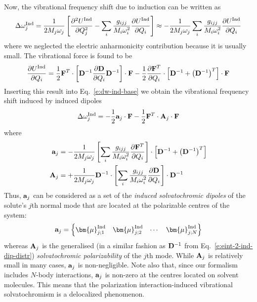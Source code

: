 \documentclass[b5paper,oneside,fleqn,11pt]{book}
\newcommand{\BM}[1]{\bm{#1}}
\newcommand{\fderiv}[2]{\ensuremath{
    \frac{\partial #1}{\partial #2}}}
\newcommand{\sderiv}[2]{\ensuremath{
    \frac{\partial^2 #1}{\partial #2^2}
    }}
\begin{document}
\begin{refsection}
Now, the vibrational frequency shift due to induction can be written
as
%
\begin{equation}\label{e:dw-ind-base}
\Delta \omega_j^{\rm Ind} =
\frac{1}{2M_j\omega_j} \left[ 
\sderiv{U^{\rm Ind}}{Q_j} -
\sum_i \frac{g_{ijj}}{M_i\omega_i^2}\fderiv{U^{\rm Ind}}{Q_i}
\right]
\approx 
-\frac{1}{2M_j\omega_j}\sum_i \frac{g_{ijj}}{M_i\omega_i^2}\fderiv{U^{\rm Ind}}{Q_i}
\end{equation}
%
where we neglected the electric anharmonicity contribution because it is usually small.
The vibrational force is found to be
%
\begin{equation} \label{e:vibr-force-ind}
\fderiv{U^{\rm Ind}}{Q_i} = \frac{1}{2} {\bf F}^{T} \cdot
     \left[ 
           {\bf D}^{-1} \fderiv{{\bf D}}{Q_i} {\bf D}^{-1}
     \right] \cdot {\bf F}
     - \frac{1}{2} \fderiv{{\bf F}^{T}}{Q_i} \cdot
     \left[
            {\bf D}^{-1} + \left({\bf D}^{-1} \right)^T
     \right] \cdot {\bf F}
\end{equation}
%
Inserting this result into Eq.~\eqref{e:dw-ind-base}
we obtain the vibrational frequency shift induced by induced dipoles
%
\begin{equation}\label{e:dw-ind-avec}
\Delta\omega_j^{\rm Ind} = - \frac{1}{2}                 {\bf a}_j \cdot {\bf F} 
                           - \frac{1}{2} {\bf F}^T \cdot {\bf A}_j \cdot {\bf F}
\end{equation}
%
where
%
\begin{subequations} \label{e:a-A}
 \begin{align}
 {\bf a}_j &= -\frac{1}{2M_j\omega_j} \left[ \sum_i \frac{g_{ijj}}{M_i\omega_i^2} 
               \fderiv{{\bf F}^T}{Q_i} \right] \cdot \left[ {\bf D}^{-1} + \left({\bf D}^{-1}\right)^T\right]\\
%
 {\bf A}_j &= +\frac{1}{2M_j\omega_j} {\bf D}^{-1} \cdot 
               \left[ \sum_i \frac{g_{ijj}}{M_i\omega_i^2} \fderiv{{\bf D}}{Q_i} \right] 
               \cdot {\bf D}^{-1}
 \end{align}
\end{subequations}
%
Thus, ${\bf a}_j$ can be considered as a set of the \emph{induced
solvatochromic dipoles} of the solute's $j$th normal mode that are 
located at the polarizable centres of the system:
%
\begin{equation} \label{e:a-vec}
 {\bf a}_j =
 \begin{Bmatrix}
  {\BM \mu}_{j;1}^{\rm Ind} & {\BM \mu}_{j;2}^{\rm Ind} & \cdots & {\BM \mu}_{j;N}^{\rm Ind}
 \end{Bmatrix}
\end{equation}
%
whereas ${\bf A}_j$ is the generalised (in a similar fashion as ${\bf D}^{-1}$ 
from Eq.~\eqref{e:eint-2-ind-dip-distr}) \emph{solvatochromic polarizability} of the $j$th mode.
While ${\bf A}_j$ is relatively small in many cases, ${\bf a}_j$ is non\hyp{}negligible.
Note also that, since our formalism includes $N$\hyp{}body interactions,
${\bf a}_j$ is non\hyp{}zero at the centres located on solvent molecules.
This means that the polarization interaction\hyp{}induced vibrational solvatochromism
is a delocalized phenomenon. 


\end{refsection}
\end{document}
